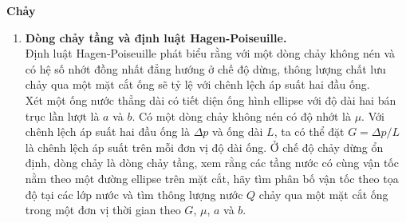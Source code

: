 \textbf{Chảy}


\begin{enumerate}
    \item \textbf{Dòng chảy tầng và định luật Hagen-Poiseuille.} \\
    Định luật Hagen-Poiseuille phát biểu rằng với một dòng chảy không nén và có hệ số nhớt đồng nhất đẳng hướng ở chế độ dừng, thông lượng chất lưu chảy qua một mặt cắt ống sẽ tỷ lệ với chênh lệch áp suất hai đầu ống. \\
    Xét một ống nước thẳng dài có tiết diện ống hình ellipse với độ dài hai bán trục lần lượt là $a$ và $b$. Có một dòng chảy không nén có độ nhớt là $\mu$. Với chênh lệch áp suất hai đầu ống là $\Delta p$ và ống dài $L$, ta có thể đặt $G=\Delta p/L$ là chênh lệch áp suất trên mỗi đơn vị độ dài ống. Ở chế độ chảy dừng ổn định, dòng chảy là dòng chảy tầng, xem rằng các tầng nước có cùng vận tốc nằm theo một đường ellipse trên mặt cắt, hãy tìm phân bố vận tốc theo tọa độ tại các lớp nước và tìm thông lượng nước $Q$ chảy qua một mặt cắt ống trong một đơn vị thời gian theo $G$, $\mu$, $a$ và $b$.

\end{enumerate}


